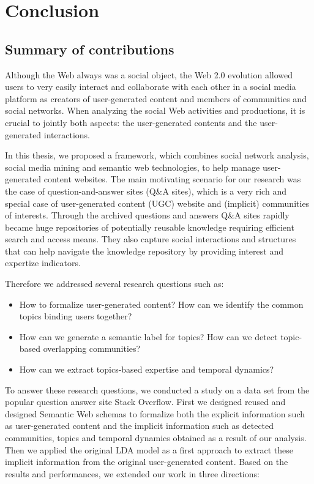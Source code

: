 \chapter{Conclusion}
\doublespacing
\label{chap:intro}
\minitoc

\section{Summary of contributions}
Although the Web always was a social object, the Web 2.0 evolution allowed users to very easily interact and collaborate with each other in a social media platform as creators of user-generated content and members of communities and social networks. When analyzing the social Web activities and productions, it is crucial to jointly both aspects: the user-generated contents and the user-generated interactions.

In this thesis, we proposed a framework, which combines social network analysis, social media mining and semantic web technologies, to help manage user-generated content websites. The main motivating scenario for our research was the case of question-and-answer sites (Q\&A sites), which is a very rich and special case of user-generated content (UGC) website and (implicit) communities of interests. Through the archived questions and answers Q\&A sites rapidly became huge repositories of potentially reusable knowledge requiring efficient search and access means. They also capture social interactions and structures that can help navigate the knowledge repository by providing interest and expertize indicators.

Therefore we addressed several research questions such as:
\begin{itemize}
\item{How to formalize user-generated content? How can we identify the common topics binding users together?}
\item{How can we generate a semantic label for topics? How can we detect topic-based overlapping communities?}
\item{How can we extract topics-based expertise and temporal dynamics?}
\end{itemize}

To answer these research questions, we conducted a study on a data set from the popular question answer site Stack Overflow. 
First we designed reused and designed Semantic Web schemas to formalize both the explicit information such as user-generated content and the implicit information such as detected communities, topics and temporal dynamics obtained as a result of our analysis.
Then we applied the original LDA model as a first approach to extract these implicit information from the original user-generated content. Based on the results and performances, we extended our work in three directions:

